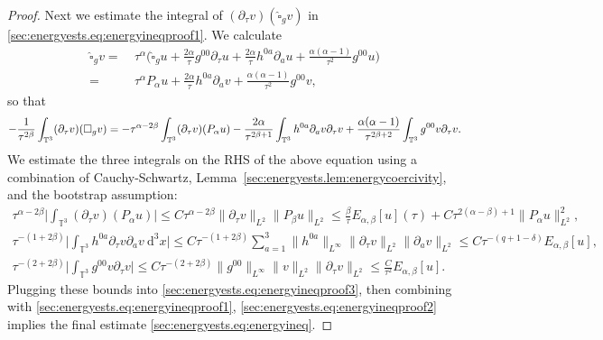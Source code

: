 \documentclass{article}
\newcommand{\TT}{\mathbb{T}}
\newcommand{\de}{\mathrm{d}}
\newcommand{\wh}{\widehat}
\newcommand{\pa}{\partial}
\begin{document}
\begin{proof}
    Next we estimate the integral of $(\pa_\tau v)(\wh{\square}_g v)$ in \eqref{sec:energyests.eq:energyineqproof1}. We calculate
    \begin{align}
        \wh{\square}_g v  =&\> \tau^\alpha \Big(\wh{\square}_g u + \frac{2\alpha}{\tau}g^{00}\pa_\tau u + \frac{2\alpha}{\tau}h^{0a}\pa_a u + \frac{\alpha(\alpha-1)}{\tau^2}g^{00} u\Big)\nonumber\\
        =&\> \tau^\alpha P_\alpha u+\frac{2\alpha}{\tau}h^{0a}\pa_a v + \frac{\alpha(\alpha-1)}{\tau^2}g^{00}v,
    \end{align}
    so that
    \begin{equation}\label{sec:energyests.eq:energyineqproof3}
        -\frac{1}{\tau^{2\beta}}\int_{\TT^3}(\pa_\tau v)(\square_g v)
        = -\tau^{\alpha-2\beta}\int_{\TT^3}(\pa_\tau v)(P_\alpha u)\\
         - \frac{2\alpha}{\tau^{2\beta+1}}\int_{\TT^3}h^{0a}\pa_a v\pa_\tau v + \frac{\alpha(\alpha-1)}{\tau^{2\beta+2}}\int_{\TT^3}g^{00}v\pa_\tau v.
    \end{equation}
    We estimate the three integrals on the RHS of the above equation using a combination of Cauchy-Schwartz, Lemma~\ref{sec:energyests.lem:energycoercivity}, and the bootstrap assumption:
    \begin{subequations}
    \begin{gather}
            \tau^{\alpha-2\beta}\Big|\int_{\TT^3}(\pa_\tau v)(P_\alpha u)\Big| \leq C\tau^{\alpha-2\beta}\|\pa_\tau v\|_{L^2}\|P_\beta u\|_{L^2}\leq \frac{\beta}{\tau}E_{\alpha,\beta}[u](\tau) + C\tau^{2(\alpha-\beta)+1}\|P_\alpha u\|_{L^2}^2,\\
            \tau^{-(1+2\beta)} \Big|\int_{\TT^3}h^{0a}\pa_\tau v\pa_a v\>\de^3 x\Big| \leq C\tau^{-(1+2\beta)} \sum_{a=1}^3\|h^{0a}\|_{L^\infty}\|\pa_\tau v\|_{L^2}\|\pa_a v\|_{L^2}\leq C\tau^{-(q+1-\delta)}E_{\alpha,\beta}[u],\\
            \tau^{-(2+2\beta)}\Big|\int_{\TT^3}g^{00}v\pa_\tau v\Big| \leq C\tau^{-(2+2\beta)}\|g^{00}\|_{L^\infty}\|v\|_{L^2}\|\pa_\tau v\|_{L^2} \leq \frac{C}{\tau^2}E_{\alpha,\beta}[u].\label{sec:energyestimates.sec:energyests.eq:energyineqproof4}
        \end{gather}
    \end{subequations}
    Plugging these bounds into \eqref{sec:energyests.eq:energyineqproof3}, then combining with \eqref{sec:energyests.eq:energyineqproof1}, \eqref{sec:energyests.eq:energyineqproof2} implies the final estimate \eqref{sec:energyests.eq:energyineq}.
\end{proof}
\end{document}
